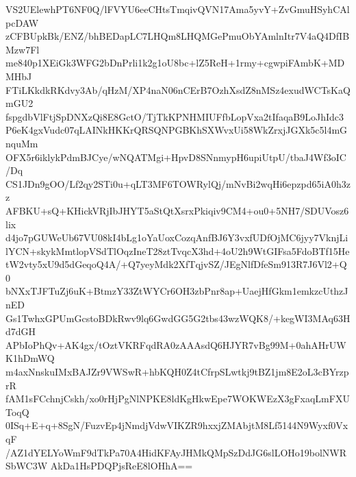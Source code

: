 VS2UElewhPT6NF0Q/lFVYU6eeCHtsTmqivQVN17Ama5yvY+ZvGmuHSyhCAlpcDAW
zCFBUpkBk/ENZ/bhBEDapLC7LHQm8LHQMGePmuObYAmlnItr7V4aQ4DfIBMzw7Fl
me840p1XEiGk3WFG2bDnPrli1k2g1oU8bc+lZ5ReH+1rmy+cgwpiFAmbK+MDMHbJ
FTiLKkdkRKdvy3Ab/qHzM/XP4naN06nCErB7OzhXsdZ8nMSz4exudWCTsKaQmGU2
fspgdbVlFtjSpDNXzQi8E8GctO/TjTkKPNHMIUFfbLopVxa2tIfaqaB9LoJhIdc3
P6eK4gxVudc07qLAINkHKKrQRSQNPGBKhSXWvxUi58WkZrxjJGXk5c5l4mGnquMm
OFX5r6iklykPdmBJCye/wNQATMgi+HpvD8SNnmypH6upiUtpU/tbaJ4Wf3oIC/Dq
CS1JDn9gOO/Lf2qy2STi0u+qLT3MF6TOWRylQj/mNvBi2wqHi6epzpd65iA0h3zz
AFBKU+sQ+KHickVRjIbJHYT5aStQtXsrxPkiqiv9CM4+ou0+5NH7/SDUVosz6lix
d4jo7pGUWeUb67VU08kI4bLg1oYaUoxCozqAnfBJ6Y3vxfUDfOjMC6jyy7VknjLi
lYCN+skykMmtlopVSdTlOqzIneT28ztTvqcX3hd+4oU2h9WtGIFsa5FdoBTf15He
tW2vty5xU9d5dGeqoQ4A/+Q7yeyMdk2XfTqjvSZ/JEgNlfDfeSm913R7J6Vl2+Q0
bNXxTJFTuZj6uK+BtmzY33ZtWYCr6OH3zbPnr8ap+UaejHfGkm1emkzcUthzJnED
Gs1TwhxGPUmGcstoBDkRwv9lq6GwdGG5G2tbs43wzWQK8/+kegWI3MAq63Hd7dGH
APbIoPhQv+AK4gx/tOztVKRFqdRA0zAAAsdQ6HJYR7vBg99M+0ahAHrUWK1hDmWQ
m4axNnskuIMxBAJZr9VWSwR+hbKQH0Z4tCfrpSLwtkj9tBZ1jm8E2oL3cBYrzprR
fAM1sFCchnjCskh/xo0rHjPgNlNPKE8ldKgHkwEpe7WOKWEzX3gFxaqLmFXUToqQ
0ISq+E+q+8SgN/FuzvEp4jNmdjVdwVIKZR9hxxjZMAbjtM8Lf5144N9Wyxf0VxqF
/AZ1dYELYoWmF9dTkPa70A4HidKFAyJHMkQMpSzDdJG6slLOHo19bolNWRSbWC3W
AkDa1HsPDQPjsReE8lOHhA==
